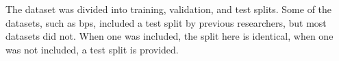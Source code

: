 
The dataset was divided into training, validation, and test
splits. Some of the datasets, such as \gls{bps}, included a
test split by previous researchers, but most datasets did
not. When one was included, the split here is identical, when 
one was not included, a test split is provided.
